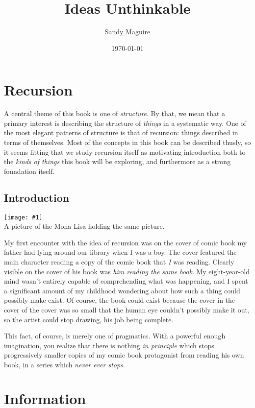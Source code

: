 \documentclass[12pt]{book}
\title{Ideas Unthinkable}
\author{Sandy Maguire}
\date{\today}
\newcommand{\fig}[3]{
    \begin{center}
    \texttt{[image: \#1]} \\
    #2 \\
    \end{center}
}
\begin{document}
 \maketitle


\chapter{Recursion}
A central theme of this book is one of \textit{structure}. By that, we mean that a primary interest is describing
the structure of \textit{things} in a systematic way. One of the most elegant patterns of structure is that of
recursion: things described in terms of themselves. Most of the concepts in this book can be described thusly, so it
seems fitting that we study recursion itself as motivating introduction both to the \textit{kinds of things} this book
will be exploring, and furthermore as a strong foundation itself.

\section{Introduction}
\fig{recursion/monalisa.jpg}{A picture of the Mona Lisa holding the same picture.}{0.75}
My first encounter with the idea of recursion was on the cover of comic book my father had lying around our library when
I was a boy. The cover featured the main character reading a copy of the comic book that \textit{I} was reading. Clearly
visible on the cover of his book was \textit{him reading the same book}. My eight-year-old mind wasn't entirely capable
of comprehending what was happening, and I spent a significant amount of my childhood wondering about how such a thing
could possibly make exist. Of course, the book could exist because the cover in the cover of the cover was so small that
the human eye couldn't possibly make it out, so the artist could stop drawing, his job being complete.

This fact, of course, is merely one of pragmatics. With a powerful enough imagination, you realize that there is nothing
\textit{in principle} which stops progressively smaller copies of my comic book protagonist from reading his own book,
in a series which \textit{never ever stops}.




\chapter{Information}

\end{document}
